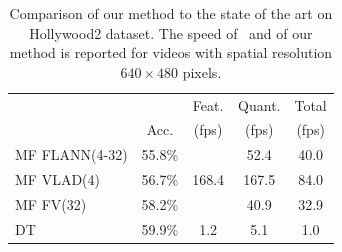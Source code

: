 \documentclass[10pt,twocolumn,letterpaper]{article}
\begin{document}

\begin{table}
\begin{center}
\begin{tabular}{|l|c|c|c|c|}
\hline
		 				&  	 		& Feat.                   	& Quant. 		& Total		\\
		 				& Acc.  	& (fps)								& (fps)			& (fps)		\\\hline
MF FLANN(4-32)	& 55.8\%	& \multirow{3}{*}{168.4} 	& 52.4    	& 40.0 	\\ %
MF VLAD(4) 		& 56.7\%	&										& 167.5	& 84.0	\\ %
MF FV(32)			& 58.2\%	&										& 40.9 	& 32.9	\\ %
\hline
DT \cite{Wang12}& 59.9\%		& 1.2									& 5.1 		&	1.0	\\\hline %
\end{tabular}
\mbox{}\\
\caption{Comparison of our method to the state of the art on Hollywood2 dataset. The speed of~\cite{Wang12} and of our method is reported for videos with spatial resolution $640\times 480$ pixels.\vspace{-.3cm}}
\label{tab:hwd2_comparison}
\end{center}
\end{table}
\end{document}
